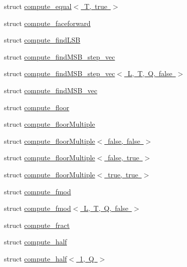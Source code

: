 \begin{DoxyCompactItemize}
struct \mbox{\hyperlink{structglm_1_1detail_1_1compute__equal_3_01_t_00_01true_01_4}{compute\+\_\+equal$<$ T, true $>$}}
\item 
struct \mbox{\hyperlink{structglm_1_1detail_1_1compute__faceforward}{compute\+\_\+faceforward}}
\item 
struct \mbox{\hyperlink{structglm_1_1detail_1_1compute__find_l_s_b}{compute\+\_\+find\+L\+SB}}
\item 
struct \mbox{\hyperlink{structglm_1_1detail_1_1compute__find_m_s_b__step__vec}{compute\+\_\+find\+M\+S\+B\+\_\+step\+\_\+vec}}
\item 
struct \mbox{\hyperlink{structglm_1_1detail_1_1compute__find_m_s_b__step__vec_3_01_l_00_01_t_00_01_q_00_01false_01_4}{compute\+\_\+find\+M\+S\+B\+\_\+step\+\_\+vec$<$ L, T, Q, false $>$}}
\item 
struct \mbox{\hyperlink{structglm_1_1detail_1_1compute__find_m_s_b__vec}{compute\+\_\+find\+M\+S\+B\+\_\+vec}}
\item 
struct \mbox{\hyperlink{structglm_1_1detail_1_1compute__floor}{compute\+\_\+floor}}
\item 
struct \mbox{\hyperlink{structglm_1_1detail_1_1compute__floor_multiple}{compute\+\_\+floor\+Multiple}}
\item 
struct \mbox{\hyperlink{structglm_1_1detail_1_1compute__floor_multiple_3_01false_00_01false_01_4}{compute\+\_\+floor\+Multiple$<$ false, false $>$}}
\item 
struct \mbox{\hyperlink{structglm_1_1detail_1_1compute__floor_multiple_3_01false_00_01true_01_4}{compute\+\_\+floor\+Multiple$<$ false, true $>$}}
\item 
struct \mbox{\hyperlink{structglm_1_1detail_1_1compute__floor_multiple_3_01true_00_01true_01_4}{compute\+\_\+floor\+Multiple$<$ true, true $>$}}
\item 
struct \mbox{\hyperlink{structglm_1_1detail_1_1compute__fmod}{compute\+\_\+fmod}}
\item 
struct \mbox{\hyperlink{structglm_1_1detail_1_1compute__fmod_3_01_l_00_01_t_00_01_q_00_01false_01_4}{compute\+\_\+fmod$<$ L, T, Q, false $>$}}
\item 
struct \mbox{\hyperlink{structglm_1_1detail_1_1compute__fract}{compute\+\_\+fract}}
\item 
struct \mbox{\hyperlink{structglm_1_1detail_1_1compute__half}{compute\+\_\+half}}
\item 
struct \mbox{\hyperlink{structglm_1_1detail_1_1compute__half_3_011_00_01_q_01_4}{compute\+\_\+half$<$ 1, Q $>$}}
\item 

\end{DoxyCompactItemize}
